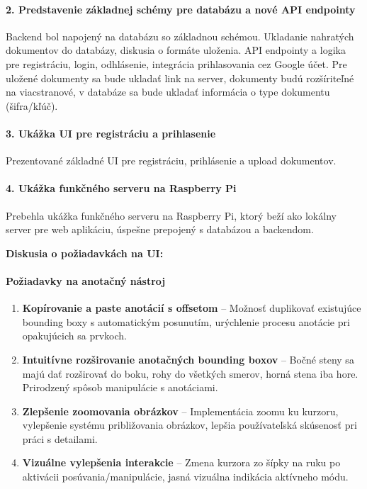 \paragraph{2. Predstavenie základnej schémy pre databázu a nové API endpointy}
Backend bol napojený na databázu so základnou schémou. Ukladanie nahratých dokumentov do databázy, diskusia o formáte uloženia. API endpointy a logika pre registráciu, login, odhlásenie, integrácia prihlasovania cez Google účet. Pre uložené dokumenty sa bude ukladať link na server, dokumenty budú rozšíriteľné na viacstranové, v databáze sa bude ukladať informácia o type dokumentu (šifra/kľúč).

\paragraph{3. Ukážka UI pre registráciu a prihlasenie}
Prezentované základné UI pre registráciu, prihlásenie a upload dokumentov.

\paragraph{4. Ukážka funkčného serveru na Raspberry Pi}
Prebehla ukážka funkčného serveru na Raspberry Pi, ktorý beží ako lokálny server pre web aplikáciu, úspešne prepojený s databázou a backendom.

\vspace{0.5cm}
\textbf{Diskusia o požiadavkách na UI:}

\paragraph{Požiadavky na anotačný nástroj}
\begin{enumerate}
    \item \textbf{Kopírovanie a paste anotácií s offsetom} – Možnosť duplikovať existujúce bounding boxy s automatickým posunutím, urýchlenie procesu anotácie pri opakujúcich sa prvkoch.
    \item \textbf{Intuitívne rozširovanie anotačných bounding boxov} – Bočné steny sa majú dať rozširovať do boku, rohy do všetkých smerov, horná stena iba hore. Prirodzený spôsob manipulácie s anotáciami.
    \item \textbf{Zlepšenie zoomovania obrázkov} – Implementácia zoomu ku kurzoru, vylepšenie systému približovania obrázkov, lepšia používateľská skúsenosť pri práci s detailami.
    \item \textbf{Vizuálne vylepšenia interakcie} – Zmena kurzora zo šípky na ruku po aktivácii posúvania/manipulácie, jasná vizuálna indikácia aktívneho módu.
\end{enumerate}


